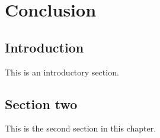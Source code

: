 \chapter{Conclusion}
\label{ch:over}


\section{Introduction}
\label{over:s:intro}

This is an introductory section.

\section{Section two}

This is the second section in this chapter.
